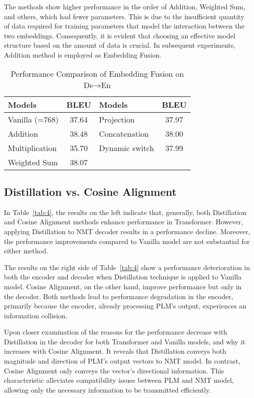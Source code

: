 \documentclass[conference]{IEEEtran}
\begin{document}
The methods show higher performance in the order of Addition, Weighted Sum, and others, which had fewer parameters. This is due to the insufficient quantity of data required for training parameters that model the interaction between the two embeddings. Consequently, it is evident that choosing an effective model structure based on the amount of data is crucial. In subsequent experiments, Addition method is employed as Embedding Fusion.
\begin{table}[!tb]
    \centering
    \caption{Performance Comparison of Embedding Fusion on De→En}
    \label{tab:3}
    \begin{tabular}{|l|c|l|c|}
        \hline
        \textbf{Models} & \textbf{BLEU} & \textbf{Models} & \textbf{BLEU} \\
        \hline
        Vanilla (=768) & 37.64 & Projection & 37.97 \\
        Addition & 38.48 & Concatenation & 38.00 \\
        Multiplication & 35.70 & Dynamic switch & 37.99 \\
        Weighted Sum & 38.07 & & \\
        \hline
    \end{tabular}
\end{table}

\subsection{Distillation vs. Cosine Alignment}
In Table~\ref{tab:4}, the results on the left indicate that, generally, both Distillation and Cosine Alignment methods enhance performance in Transformer. However, applying Distillation to NMT decoder results in a performance decline. Moreover, the performance improvements compared to Vanilla model are not substantial for either method.

The results on the right side of Table~\ref{tab:4} show a performance deterioration in both the encoder and decoder when Distillation technique is applied to Vanilla model. Cosine Alignment, on the other hand, improve performance but only in the decoder. Both methods lead to performance degradation in the encoder, primarily because the encoder, already processing PLM's output, experiences an information collision.

Upon closer examination of the reasons for the performance decrease with Distillation in the decoder for both Transformer and Vanilla models, and why it increases with Cosine Alignment. It reveals that Distillation conveys both magnitude and direction of PLM's output vectors to NMT model. In contrast, Cosine Alignment only conveys the vector's directional information. This characteristic alleviates compatibility issues between PLM and NMT model, allowing only the necessary information to be transmitted efficiently.
\end{document}
